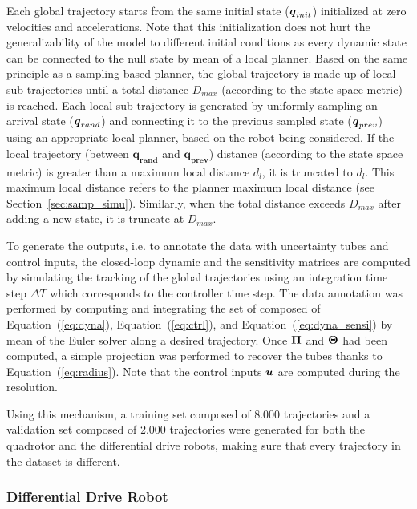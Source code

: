 Each global trajectory starts from the same initial state ($\boldsymbol{q}_{init}$) initialized at zero velocities and accelerations.
Note that this initialization does not hurt the generalizability of the model to different initial conditions as every dynamic state can be connected to the null state by mean of a local planner.
Based on the same principle as a sampling-based planner, the global trajectory is made up of local sub-trajectories until a total distance $D_{max}$ (according to the state space metric) is reached.
Each local sub-trajectory is generated by uniformly sampling an arrival state ($\boldsymbol{q}_{rand}$) and connecting it to the previous sampled state ($\boldsymbol{q}_{prev}$) using an appropriate local planner, based on the robot being considered.
If the local trajectory (between $\boldsymbol{q_{rand}}$ and $\boldsymbol{q_{prev}}$) distance (according to the state space metric) is greater than a maximum local distance $d_l$, it is truncated to $d_l$. 
This maximum local distance refers to the planner maximum local distance (see Section~\ref{sec:samp_simu}).
Similarly, when the total distance exceeds $D_{max}$ after adding a new state, it is truncate at $D_{max}$.

To generate the outputs, i.e. to annotate the data with uncertainty tubes and control inputs, the closed-loop dynamic and the sensitivity matrices are computed by simulating the tracking of the global trajectories using an integration time step $\Delta T$ which corresponds to the controller time step.
The data annotation was performed by computing and integrating the set of  composed of Equation~(\ref{eq:dyna}), Equation~(\ref{eq:ctrl}), and Equation~(\ref{eq:dyna_sensi}) by mean of the Euler  solver along a desired trajectory. 
Once $\boldsymbol{\Pi}$ and $\boldsymbol{\Theta}$ had been computed, a simple projection was performed to recover the tubes thanks to Equation~(\ref{eq:radius}).
Note that the control inputs $\boldsymbol{u}$ are computed during the  resolution.

Using this mechanism, a training set composed of 8.000 trajectories and a validation set composed of 2.000 trajectories were generated for both the quadrotor and the differential drive robots, making sure that every trajectory in the dataset is different.

\subsubsection{Differential Drive Robot}\label{sec:dataset_unic}

